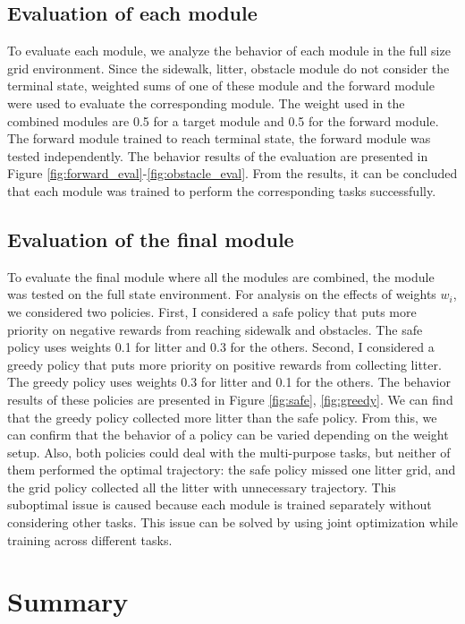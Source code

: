 \documentclass[conference]{IEEEtran}
\begin{document}
\subsection{Evaluation of each module}
To evaluate each module, we analyze the behavior of each module in the full size grid environment.
Since the sidewalk, litter, obstacle module do not consider the terminal state, weighted sums of one of these module and the forward module were used to evaluate the corresponding module.
The weight used in the combined modules are 0.5 for a target module and 0.5 for the forward module.
The forward module trained to reach terminal state, the forward module was tested independently.
The behavior results of the evaluation are presented in Figure \ref{fig:forward_eval}-\ref{fig:obstacle_eval}.
From the results, it can be concluded that each module was trained to perform the corresponding tasks successfully. 

\subsection{Evaluation of the final module}

To evaluate the final module where all the modules are combined, the module was tested on the full state environment. 
For analysis on the effects of weights $w_i$, we considered two policies.
First, I considered a safe policy that puts more priority on negative rewards from reaching sidewalk and obstacles.
The safe policy uses weights 0.1 for litter and 0.3 for the others.
Second, I considered a greedy policy that puts more priority on positive rewards from collecting litter.
The greedy policy uses weights 0.3 for litter and 0.1 for the others.
The behavior results of these policies are presented in Figure \ref{fig:safe}, \ref{fig:greedy}.
We can find that the greedy policy collected more litter than the safe policy.
From this, we can confirm that the behavior of a policy can be varied depending on the weight setup.
Also, both policies could deal with the multi-purpose tasks, but neither of them performed the optimal trajectory: the safe policy missed one litter grid, and the grid policy collected all the litter with unnecessary trajectory.
This suboptimal issue is caused because each module is trained separately without considering other tasks.
This issue can be solved by using joint optimization while training across different tasks.
 

\section{Summary} %
\end{document}
